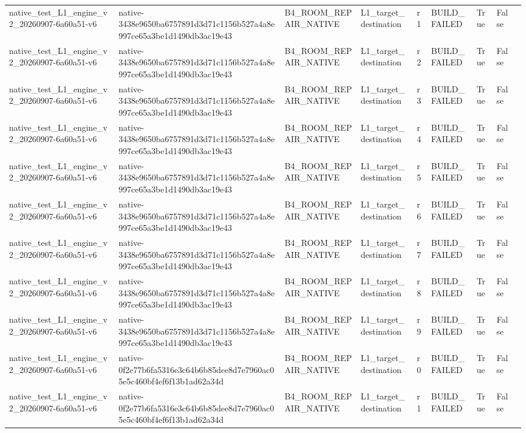 \begin{tabular}{lllllllll}
native\_test\_L1\_engine\_v2\_20260907-6a60a51-v6 & native-3438e9650ba6757891d3d71c1156b527a4a8e997ce65a3be1d1490db3ac19e43 & B4\_ROOM\_REPAIR\_NATIVE & L1\_target\_destination & r1 & BUILD\_FAILED & True & False &  \\
native\_test\_L1\_engine\_v2\_20260907-6a60a51-v6 & native-3438e9650ba6757891d3d71c1156b527a4a8e997ce65a3be1d1490db3ac19e43 & B4\_ROOM\_REPAIR\_NATIVE & L1\_target\_destination & r2 & BUILD\_FAILED & True & False &  \\
native\_test\_L1\_engine\_v2\_20260907-6a60a51-v6 & native-3438e9650ba6757891d3d71c1156b527a4a8e997ce65a3be1d1490db3ac19e43 & B4\_ROOM\_REPAIR\_NATIVE & L1\_target\_destination & r3 & BUILD\_FAILED & True & False &  \\
native\_test\_L1\_engine\_v2\_20260907-6a60a51-v6 & native-3438e9650ba6757891d3d71c1156b527a4a8e997ce65a3be1d1490db3ac19e43 & B4\_ROOM\_REPAIR\_NATIVE & L1\_target\_destination & r4 & BUILD\_FAILED & True & False &  \\
native\_test\_L1\_engine\_v2\_20260907-6a60a51-v6 & native-3438e9650ba6757891d3d71c1156b527a4a8e997ce65a3be1d1490db3ac19e43 & B4\_ROOM\_REPAIR\_NATIVE & L1\_target\_destination & r5 & BUILD\_FAILED & True & False &  \\
native\_test\_L1\_engine\_v2\_20260907-6a60a51-v6 & native-3438e9650ba6757891d3d71c1156b527a4a8e997ce65a3be1d1490db3ac19e43 & B4\_ROOM\_REPAIR\_NATIVE & L1\_target\_destination & r6 & BUILD\_FAILED & True & False &  \\
native\_test\_L1\_engine\_v2\_20260907-6a60a51-v6 & native-3438e9650ba6757891d3d71c1156b527a4a8e997ce65a3be1d1490db3ac19e43 & B4\_ROOM\_REPAIR\_NATIVE & L1\_target\_destination & r7 & BUILD\_FAILED & True & False &  \\
native\_test\_L1\_engine\_v2\_20260907-6a60a51-v6 & native-3438e9650ba6757891d3d71c1156b527a4a8e997ce65a3be1d1490db3ac19e43 & B4\_ROOM\_REPAIR\_NATIVE & L1\_target\_destination & r8 & BUILD\_FAILED & True & False &  \\
native\_test\_L1\_engine\_v2\_20260907-6a60a51-v6 & native-3438e9650ba6757891d3d71c1156b527a4a8e997ce65a3be1d1490db3ac19e43 & B4\_ROOM\_REPAIR\_NATIVE & L1\_target\_destination & r9 & BUILD\_FAILED & True & False &  \\
native\_test\_L1\_engine\_v2\_20260907-6a60a51-v6 & native-0f2e77b6fa5316e3c64b6b85dee8d7e7960ac05e5c460bf4ef6f13b1ad62a34d & B4\_ROOM\_REPAIR\_NATIVE & L1\_target\_destination & r0 & BUILD\_FAILED & True & False &  \\
native\_test\_L1\_engine\_v2\_20260907-6a60a51-v6 & native-0f2e77b6fa5316e3c64b6b85dee8d7e7960ac05e5c460bf4ef6f13b1ad62a34d & B4\_ROOM\_REPAIR\_NATIVE & L1\_target\_destination & r1 & BUILD\_FAILED & True & False &  \\

\end{tabular}
